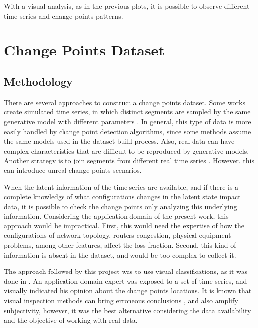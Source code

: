 With a visual analysis, as in the previous plots, it is possible to observe different time series and change points patterns.

\section{Change Points Dataset}

\subsection{Methodology}

There are several approaches to construct a change points dataset. Some works create simulated time series, in which distinct segments are sampled by the same generative model with different parameters \cite{change_point_detection_in_time_series_data_by_relative_density_ratio_estimation}. In general, this type of data is more easily handled by change point detection algorithms, since some methods assume the same models used in the dataset build process. Also, real data can have complex characteristics that are difficult to be reproduced by generative models. Another strategy is to join segments from different real time series \cite{inertial_hidden_markov_models_modeling_change_in_multivariate_time_series}. However, this can introduce unreal change points scenarios.

When the latent information of the time series are available, and if there is a complete knowledge of what configurations changes in the latent state impact data, it is possible to check the change points only analyzing this underlying information. Considering the application domain of the present work, this approach would be impractical. First, this would need the expertise of how the configurations of network topology, routers congestion, physical equipment problems, among other features, affect the loss fraction. Second, this kind of information is absent in the dataset, and would be too complex to collect it. 

The approach followed by this project was to use visual classifications, as it was done in \cite{learning_sparse_penalties_for_change_point_detection_using_max_margin_interval_regression}. An application domain expert was exposed to a set of time series, and visually indicated his opinion about the change points locations. It is known that visual inspection methods can bring erroneous conclusions \cite{leveraging_cloud_data_to_mitigate_user_experience_from_breaking_bad}, and also amplify subjectivity, however, it was the best alternative considering the data availability and the objective of working with real data.

